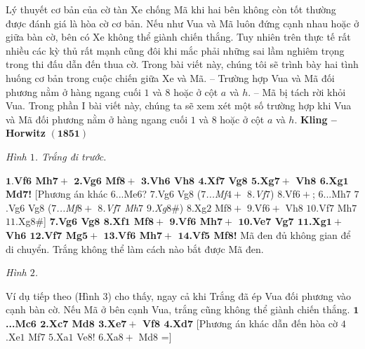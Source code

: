 \vspace*{150pt}
\begin{multicols}{2}
	Lý thuyết cơ bản của cờ tàn Xe chống Mã khi hai bên không còn tốt thường được đánh giá là hòa cờ cơ bản. Nếu như Vua và Mã luôn đứng cạnh nhau hoặc ở giữa bàn cờ, bên có Xe không thể giành chiến thắng. Tuy nhiên trên thực tế rất nhiều các kỳ thủ rất mạnh cũng đôi khi mắc phải những sai lầm nghiêm trọng trong thi đấu dẫn đến thua cờ.
	\vskip 0.05cm
	Trong bài viết này, chúng tôi sẽ trình bày hai tình huống cơ bản trong cuộc chiến giữa Xe và Mã.
	\vskip 0.05cm
	-- Trường hợp Vua và Mã đối phương nằm ở hàng ngang cuối $1$ và $8$ hoặc ở cột $a$ và $h$.
	\vskip 0.05cm
	-- Mã bị tách rời khỏi Vua.
	\vskip 0.05cm
	Trong phần I bài viết này, chúng ta sẽ xem xét một số trường hợp khi Vua và Mã đối phương nằm ở hàng ngang cuối $1$ và $8$ hoặc ở cột $a$ và $h$.
	\vskip 0.05cm
	\textbf{\color{gocco}Kling -- Horwitz} $\pmb{(1851)}$
	\begin{center}
		\newgame
		\scalebox{0.85}\showboard
		\vskip 0.1cm
		\textit{\small\color{gocco}Hình $1$. Trắng đi trước.}
	\end{center}
	\textbf{\color{gocco}$\pmb{1.}$Vf$\pmb{6}$ Mh$\pmb{7+}$ $\pmb{2}$.Vg$\pmb{6}$ Mf$\pmb{8+}$ $\pmb{3}$.Vh$\pmb{6}$ Vh$\pmb{8}$ $\pmb{4}$.Xf$\pmb{7}$ Vg$\pmb{8}$ $\pmb{5}$.Xg$\pmb{7+}$ Vh$\pmb{8}$ $\pmb{6}$.Xg$\pmb{1}$ Md$\pmb{7}$!} [Phương án khác $6$...Me$6$? $7$.Vg$6$ Vg$8$ (\textit{$7$...Mf$4+$ $8$.Vf$7$}) $8$.Vf$6+$; $6$...Mh$7$ $7$.Vg$6$ Vg$8$ (\textit{$7$...Mf$8+$ $8$.Vf$7$ Mh$7$ $9$.Xg$8\#$}) $8$.Xg$2$ Mf$8+$ $9$.Vf$6+$ Vh$8$ $10$.Vf$7$ Mh$7$ $11$.Xg$8\#$]
	\vskip 0.1cm
	\textbf{\color{gocco}$\pmb{7}$.Vg$\pmb{6}$ Vg$\pmb{8}$ $\pmb{8}$.Xf$\pmb{1}$ Mf$\pmb{8+}$ $\pmb{9}$.Vf$\pmb{6}$ Mh$\pmb{7+}$ $\pmb{10}$.Ve$\pmb{7}$ Vg$\pmb{7}$ $\pmb{11}$.Xg$\pmb{1+}$ Vh$\pmb{6}$ $\pmb{12}$.Vf$\pmb{7}$ Mg$\pmb{5+}$ $\pmb{13}$.Vf$\pmb{6}$ Mh$\pmb{7+}$ $\pmb{14}$.Vf$\pmb{5}$ Mf$\pmb{8}$!} Mã đen đủ không gian để di chuyển. Trắng không thể làm cách nào bắt được Mã đen. 
	\begin{center}
		\newgame
		\scalebox{0.85}\showboard
		\vskip 0.2cm
		\textit{\small\color{gocco}Hình $2$.}
	\end{center}
	Ví dụ tiếp  theo (Hình $3$) cho thấy, ngay cả khi Trắng đã ép Vua đối phương vào cạnh bàn cờ. Nếu Mã ở bên cạnh Vua, trắng cũng không thể giành chiến thắng.
	\vskip 0.1cm
	\textbf{\color{gocco}$\pmb{1}$...Mc$\pmb{6}$ $\pmb{2}$.Xc$\pmb{7}$ Md$\pmb{8}$ $\pmb{3}$.Xe$\pmb{7+}$ Vf$\pmb{8}$ $\pmb{4}$.Xd$\pmb{7}$} [Phương án khác dẫn đến hòa cờ $4$.Xe$1$ Mf$7$ $5$.Xa$1$ Ve$8$! $6$.Xa$8+$ Md$8$ =]

\end{multicols}
